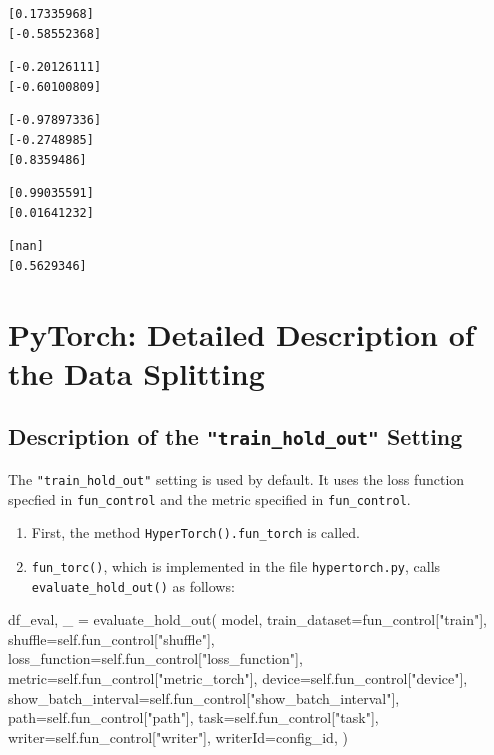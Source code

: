 \documentclass[
  letterpaper,
  DIV=11,
  numbers=noendperiod]{scrreprt}
\newenvironment{Shaded}{\begin{snugshade}}{\end{snugshade}}
\newcommand{\NormalTok}[1]{\textcolor[rgb]{0.00,0.23,0.31}{#1}}
\providecommand{\tightlist}{%
  \setlength{\itemsep}{0pt}\setlength{\parskip}{0pt}}\usepackage{longtable,booktabs,array}
\begin{document}
\begin{verbatim}
[0.17335968]
[-0.58552368]
\end{verbatim}

\begin{verbatim}
[-0.20126111]
[-0.60100809]
\end{verbatim}

\begin{verbatim}
[-0.97897336]
[-0.2748985]
[0.8359486]
\end{verbatim}

\begin{verbatim}
[0.99035591]
[0.01641232]
\end{verbatim}

\begin{verbatim}
[nan]
[0.5629346]
\end{verbatim}

\newpage{}

\hypertarget{sec-detailed-data-splitting}{%
\section{PyTorch: Detailed Description of the Data
Splitting}\label{sec-detailed-data-splitting}}

\hypertarget{description-of-the-train_hold_out-setting}{%
\subsection{\texorpdfstring{Description of the
\texttt{"train\_hold\_out"}
Setting}{Description of the "train\_hold\_out" Setting}}\label{description-of-the-train_hold_out-setting}}

The \texttt{"train\_hold\_out"} setting is used by default. It uses the
loss function specfied in \texttt{fun\_control} and the metric specified
in \texttt{fun\_control}.

\begin{enumerate}
\def\labelenumi{\arabic{enumi}.}
\tightlist
\item
  First, the method \texttt{HyperTorch().fun\_torch} is called.
\item
  \texttt{fun\_torc()}, which is implemented in the file
  \texttt{hypertorch.py}, calls \texttt{evaluate\_hold\_out()} as
  follows:
\end{enumerate}

\begin{Shaded}
\begin{Highlighting}[]
\NormalTok{df\_eval, \_ = evaluate\_hold\_out(}
\NormalTok{    model,}
\NormalTok{    train\_dataset=fun\_control["train"],}
\NormalTok{    shuffle=self.fun\_control["shuffle"],}
\NormalTok{    loss\_function=self.fun\_control["loss\_function"],}
\NormalTok{    metric=self.fun\_control["metric\_torch"],}
\NormalTok{    device=self.fun\_control["device"],}
\NormalTok{    show\_batch\_interval=self.fun\_control["show\_batch\_interval"],}
\NormalTok{    path=self.fun\_control["path"],}
\NormalTok{    task=self.fun\_control["task"],}
\NormalTok{    writer=self.fun\_control["writer"],}
\NormalTok{    writerId=config\_id,}
\NormalTok{)}
\end{Highlighting}
\end{Shaded}
\end{document}
